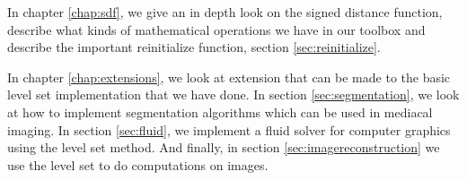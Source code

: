 In chapter \vref{chap:sdf}, we give an in depth look on the signed distance function, describe what kinds of mathematical operations we have in our toolbox and describe the important reinitialize function, section \vref{sec:reinitialize}.

In chapter \vref{chap:extensions}, we look at extension that can be made to the basic level set implementation that we have done. In section \vref{sec:segmentation}, we look at how to implement segmentation algorithms which can be used in mediacal imaging. In section \vref{sec:fluid}, we implement a fluid solver for computer graphics using the level set method. And finally, in section \vref{sec:imagereconstruction}  we use the level set to do computations on images.




